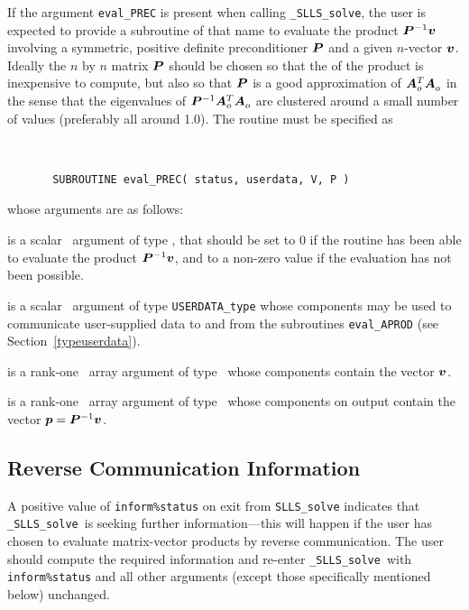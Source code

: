 \documentclass{galahad}
\newcommand{\packagename}{SLLS}
\newcommand{\fullpackagename}{\libraryname\_\packagename}
\newcommand{\solver}{{\tt \fullpackagename\_solve}}
\begin{document}
If the argument {\tt eval\_PREC} is present when calling \solver, the
user is expected to provide a subroutine of that name to evaluate the
product ${\bm{P}}^{-1} {\bm{v}}$ involving a symmetric, positive definite 
preconditioner ${\bm{P}}$ and a given $n$-vector ${\bm{v}}$.
Ideally the $n$ by $n$ matrix ${\bm{P}}$ should be chosen so that the
of the product is inexpensive to compute, but also so that ${\bm{P}}$ is
a good approximation of ${\bm{A}}_o^T {\bm{A}}_o^{}$ in the sense that the eigenvalues
of ${\bm{P}}^{-1} {\bm{A}}_o^T {\bm{A}}_o^{}$ are clustered around a small number of values
(preferably all around 1.0). The routine must be specified as

\def\baselinestretch{0.8}
{\tt
\begin{verbatim}
       SUBROUTINE eval_PREC( status, userdata, V, P )
\end{verbatim} }
\def\baselinestretch{1.0}
\noindent whose arguments are as follows:

\begin{description}
 is a scalar \intentout\ argument of type \integer,
that should be set to 0 if the routine has been able to evaluate the
product ${\bm{P}}^{-1} {\bm{v}}$, 
and to a non-zero value if the evaluation has not been possible.

 is a scalar \intentinout\ argument of type
{\tt USERDATA\_type} whose components may be used
to communicate user-supplied data to and from the subroutines
{\tt eval\_APROD}
(see Section~\ref{typeuserdata}).

 is a rank-one \intentin\ array argument of type \realdp\
whose components contain the vector ${\bm{v}}$.

 is a rank-one \intentinout\ array argument of type \realdp\
whose components on output contain the vector ${\bm{p}} = {\bm{P}}^{-1} {\bm{v}}$.

\end{description}



\subsection{\label{reverse}Reverse Communication Information}

A positive value of {\tt inform\%status} on exit from
{\tt \packagename\_solve}
indicates that
\solver\ is seeking further information---this will happen
if the user has chosen to evaluate matrix-vector products by
reverse communication.
The user should compute the required information and re-enter \solver\
with {\tt inform\%status} and all other arguments (except those specifically
mentioned below) unchanged.
\end{document}
